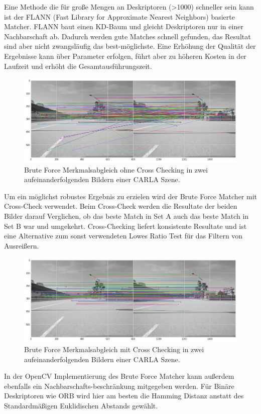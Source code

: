 Eine Methode die für gro{\ss}e Mengen an Deskriptoren (>1000) \cite{Mouats.PerfD} schneller sein kann ist der FLANN (Fast Library for Approximate Nearest Neighbors) basierte Matcher. FLANN baut einen KD-Baum und gleicht Deskriptoren nur in einer Nachbarschaft ab. Dadurch werden gute Matches schnell gefunden, das Resultat sind aber nicht zwangsläufig das best-möglichste. Eine Erhöhung der Qualität der Ergebnisse kann über Parameter erfolgen, führt aber zu höheren Kosten in der Laufzeit und erhöht die Gesamtausführungszeit.\\
%
\begin{figure}[!h]
  \begin{center}
    \includegraphics[width=\textwidth]{pictures/bf_matching_no_crosscheck_systementwurf.png}
    \caption[Brute Force Matching ohne Crosscheck]{Brute Force Merkmalsabgleich ohne Cross Checking in zwei aufeinanderfolgenden Bildern einer CARLA Szene.}
  \end{center}
\end{figure}
%
Um ein möglichst robustes Ergebnis zu erzielen wird der Brute Force Matcher mit Cross-Check verwendet. Beim Cross-Check werden die Resultate der beiden Bilder darauf Verglichen, ob das beste Match in Set A auch das beste Match in Set B war und umgekehrt. 
Cross-Checking liefert konsistente Resultate und ist eine Alternative zum sonst verwendeten Lowes Ratio Test für das Filtern von Ausrei{\ss}ern. \cite{cvdocMatch}
%
\begin{figure}[!h]
  \begin{center}
    \includegraphics[width=\textwidth]{pictures/bf_matching_with_crosscheck_systementwurf.png}
    \caption[Brute Force Matching mit Crosscheck]{Brute Force Merkmalsabgleich mit Cross Checking in zwei aufeinanderfolgenden Bildern einer CARLA Szene.}
  \end{center}
\end{figure}
%
In der OpenCV Implementierung des Brute Force Matcher kann au{\ss}erdem ebenfalls ein Nachbarschafts-beschränkung mitgegeben werden. Für Binäre Deskriptoren wie ORB wird hier am besten die Hamming Distanz anstatt des Standardmä{\ss}igen Euklidischen Abstands gewählt.


